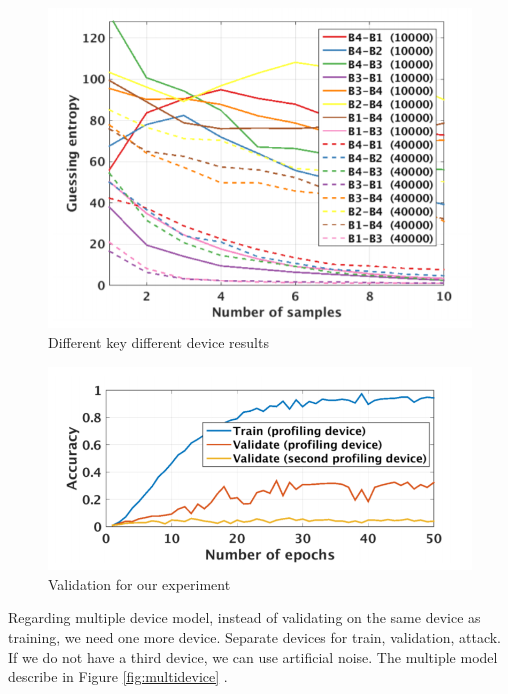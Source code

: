 \begin{figure}
    \centering
    \includegraphics[scale=0.5]{images/chapter8/different_key_different_device.PNG}
    \caption{Different key different device results}
    \label{fig:different_key_differnet_device}
\end{figure}

\begin{figure}
    \centering
    \includegraphics[scale=0.5]{images/chapter8/validation.PNG}
    \caption{Validation for our experiment}
    \label{fig:validation}
\end{figure}

Regarding multiple device model, instead of validating on the same device as training, we need
one more device. Separate devices for train, validation, attack. If we do not have a third device, we can use artificial noise. The multiple model describe in Figure \ref{fig:multidevice} .
 

